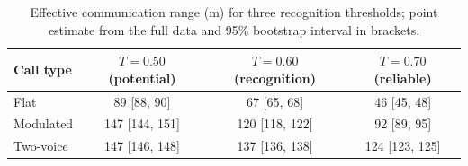 \begin{table}[!ht]
\centering
\caption{Effective communication range (m) for three recognition thresholds; point estimate from the full data and 95\% bootstrap interval in brackets.}
\label{tab:p2ranges}
\small
\begin{tabular}{lccc}
\toprule
Call type & $T=0.50$ (potential) & $T=0.60$ (recognition) & $T=0.70$ (reliable) \\
\midrule
Flat & 89 [88, 90] & 67 [65, 68] & 46 [45, 48] \\
Modulated & 147 [144, 151] & 120 [118, 122] & 92 [89, 95] \\
Two-voice & 147 [146, 148] & 137 [136, 138] & 124 [123, 125] \\
\bottomrule
\end{tabular}
\end{table}